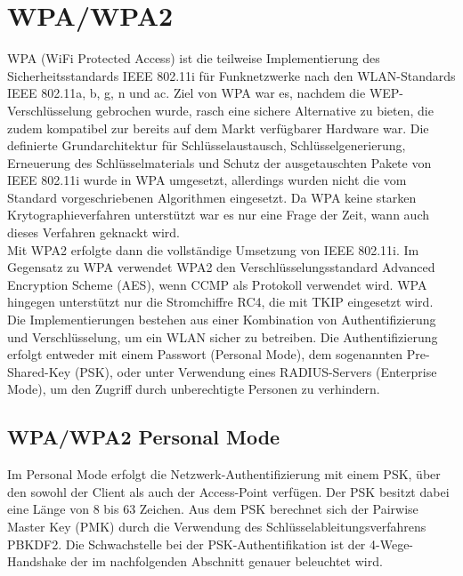 \section{WPA/WPA2}

WPA (WiFi Protected Access) ist die teilweise Implementierung des Sicherheitsstandards IEEE  802.11i für Funknetzwerke nach den WLAN-Standards IEEE 802.11a, b, g, n und ac. Ziel von WPA war es, nachdem die WEP-Verschlüsselung gebrochen wurde, rasch eine sichere Alternative zu bieten, die zudem kompatibel zur bereits auf dem Markt verfügbarer Hardware war. Die definierte Grundarchitektur für Schlüsselaustausch, Schlüsselgenerierung, Erneuerung des Schlüsselmaterials und Schutz der ausgetauschten Pakete von IEEE 802.11i wurde in WPA umgesetzt, allerdings wurden nicht die vom Standard vorgeschriebenen Algorithmen eingesetzt. Da WPA keine starken Krytographieverfahren unterstützt war es nur eine Frage der Zeit, wann auch dieses Verfahren geknackt wird. \\
Mit WPA2 erfolgte dann die vollständige Umsetzung von IEEE 802.11i. Im Gegensatz zu WPA verwendet WPA2 den Verschlüsselungsstandard Advanced Encryption Scheme (AES), wenn CCMP als Protokoll verwendet wird. WPA hingegen unterstützt nur die Stromchiffre RC4, die mit TKIP eingesetzt wird. \\
Die Implementierungen bestehen aus einer Kombination von Authentifizierung und Verschlüsselung, um ein WLAN sicher zu betreiben. Die Authentifizierung erfolgt entweder mit einem Passwort (Personal Mode), dem sogenannten Pre-Shared-Key (PSK), oder unter Verwendung eines RADIUS-Servers (Enterprise Mode), um den Zugriff durch unberechtigte Personen zu verhindern. \\

\subsection{WPA/WPA2 Personal Mode}
Im Personal Mode erfolgt die Netzwerk-Authentifizierung mit einem PSK, über den sowohl der Client als auch der Access-Point verfügen. Der PSK besitzt dabei eine Länge von 8 bis 63 Zeichen. Aus dem PSK berechnet sich der Pairwise Master Key (PMK) durch die Verwendung des Schlüsselableitungsverfahrens PBKDF2. Die Schwachstelle bei der PSK-Authentifikation ist der 4-Wege-Handshake der im nachfolgenden Abschnitt genauer beleuchtet wird.

\newpage

